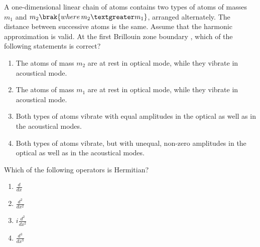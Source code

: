     \item A one-dimensional linear chain of atoms contains two types of atoms of masses $m_1$ and $m_2\brak{where\,m_2\textgreater m_1}$, arranged alternately. The distance between successive atoms is the same. Assume that the harmonic approximation is valid. At the first Brillouin zone boundary , which of the following statements is correct?
    \begin{enumerate}
        \item The atoms of mass $m_2$ are at rest in optical mode, while they vibrate in acoustical mode.
        \item The atoms of mass $m_1$ are at rest in optical mode, while they vibrate in acoustical mode.
        \item Both types of atoms vibrate with equal amplitudes in the optical as well as in the acoustical modes.
        \item Both types of atoms vibrate, but with unequal, non-zero amplitudes in the optical as well as in the acoustical modes.
    \end{enumerate}
    \item Which of the following operators is Hermitian?
    \begin{enumerate}
        \item $\frac{d}{dx}$
        \item $\frac{d^2}{dx^2}$
        \item $i\frac{d^2}{dx^2}$
        \item $\frac{d^3}{dx^3}$
    \end{enumerate}
